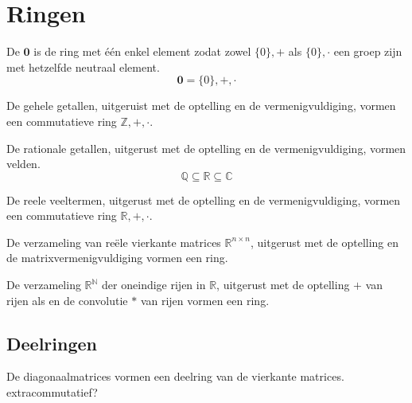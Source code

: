\documentclass[main.tex]{subfiles}
\begin{document}
\section{Ringen}
\label{sec:ringen}

\begin{de}
  De  $\boldsymbol{0}$ is de ring met \'e\'en enkel element zodat zowel $\{0\},+$ als $\{0\},\cdot$ een groep zijn met hetzelfde neutraal element.
  \[ \boldsymbol{0} = \{0\},+,\cdot \]
  \commj
\end{de}

\begin{vb}
  De gehele getallen, uitgeruist met de optelling en de vermenigvuldiging, vormen een commutatieve ring $\mathbb{Z},+,\cdot$.
  \commj
\end{vb}

\begin{vb}
  De rationale getallen, uitgerust met de optelling en de vermenigvuldiging, vormen velden.
  \[ \mathbb{Q} \subseteq \mathbb{R} \subseteq \mathbb{C} \]
  \commj
\end{vb}

\begin{vb}
  De reele veeltermen, uitgerust met de optelling en de vermenigvuldiging, vormen een commutatieve ring $\mathbb{R},+,\cdot$.\\
  \commj
\end{vb}

\begin{vb}
  De verzameling van re\"ele vierkante matrices $\mathbb{R}^{n\times n}$, uitgerust met de optelling en de matrixvermenigvuldiging vormen een ring. 
\end{vb}

\begin{vb}
  De verzameling $\mathbb{R}^{\mathbb{N}}$ der oneindige rijen in $\mathbb{R}$, uitgerust met de optelling $+$ van rijen als en de convolutie $*$ van rijen vormen een ring.\\
  \commj
\end{vb}

\subsection{Deelringen}
\label{sec:deelringen}

\begin{vb}
  De diagonaalmatrices vormen een deelring van de vierkante matrices.
  extra{commutatief?}
\end{vb}
\end{document}
